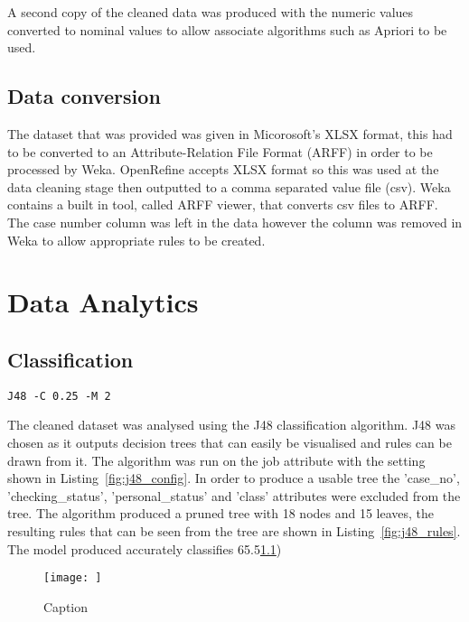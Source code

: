 \documentclass[12pt]{article}
\begin{document}
A second copy of the cleaned data was produced with the numeric values converted to nominal values to allow associate algorithms such as Apriori to be used.

\subsection{Data conversion}
The dataset that was provided was given in Micorosoft's XLSX format, this had to be converted to an Attribute-Relation File Format (ARFF) in order to be processed by Weka. OpenRefine accepts XLSX format so this was used at the data cleaning stage then outputted to a comma separated value file (csv). Weka contains a built in tool, called ARFF viewer, that converts csv files to ARFF. The case number column was left in the data however the column was removed in Weka to allow appropriate rules to be created.
\section{Data Analytics}
\subsection{Classification}

\begin{lstlisting}[caption="J48 configuration"\label{fig:j48_config}]
J48 -C 0.25 -M 2
\end{lstlisting}

The cleaned dataset was analysed using the J48 classification algorithm. J48 was chosen as it outputs decision trees that can easily be visualised and rules can be drawn from it. The algorithm was run on the job attribute with the setting shown in Listing~\ref{fig:j48_config}. In order to produce a usable tree the 'case\_no', 'checking\_status', 'personal\_status' and 'class' attributes were excluded from the tree. The algorithm produced a pruned tree with 18 nodes and 15 leaves, the resulting rules that can be seen from the tree are shown in Listing~\ref{fig:j48_rules}. The model produced accurately classifies 65.5\ref{})

\begin{figure}
    \centering
    \texttt{[image: ]}
    \caption{Caption}
    \label{fig:my_label}
\end{figure}
\end{document}
